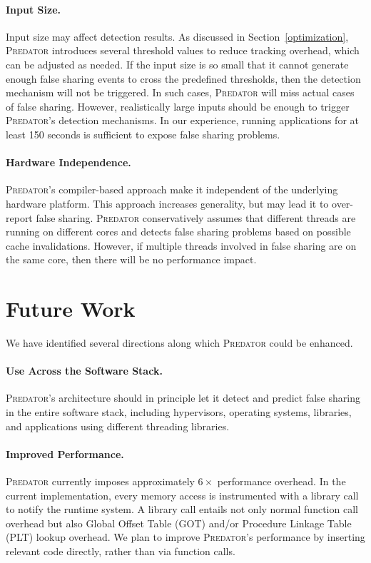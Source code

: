 \documentclass[10pt]{sigplanconf}
\newcommand{\Predator}{{\scshape Predator}}
\begin{document}
\paragraph{Input Size.} Input size may affect detection results.  As discussed in Section~\ref{optimization}, \Predator{} introduces several threshold values to reduce tracking overhead, which can be adjusted as needed. If the input size is so small that it cannot generate enough false sharing events to cross the predefined thresholds, then the detection mechanism will not be triggered. In such cases, \Predator{} will miss actual cases of false sharing. However, realistically large inputs should be enough to trigger \Predator{}'s detection mechanisms. In our experience, running applications for at least 150 seconds is sufficient to expose false sharing problems. 

\paragraph{Hardware Independence.}  \Predator{}'s compiler-based approach make it independent of the underlying hardware platform. This approach increases generality, but may lead it to over-report false sharing. \Predator{} conservatively assumes that different threads are running on different cores and detects false sharing problems based on possible cache invalidations. However, if multiple threads involved in false sharing are on the same core, then there will be no performance impact. 

\section{Future Work}
\label{sec:futurework}

We have identified several directions along which \Predator{} could be enhanced.

\paragraph{Use Across the Software Stack.} 
\Predator{}'s architecture should in principle let it detect and predict false sharing in the entire software stack, including hypervisors, operating systems, libraries, and applications using different threading libraries.

\paragraph{Improved Performance.}
\Predator{} currently imposes approximately $6\times$ performance overhead. In the current implementation, every memory access is instrumented with a library call to notify the runtime system. A library call entails not only normal function call overhead but also Global Offset Table (GOT) and/or Procedure Linkage Table (PLT) lookup overhead. We plan to improve \Predator{}'s performance by inserting relevant code directly, rather than via function calls.
\end{document}
